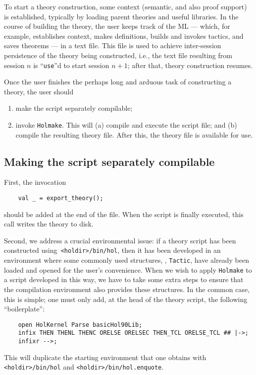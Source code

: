 To start a theory construction, some context (semantic, and also proof
support) is established, typically by loading parent theories and useful
libraries. In the course of building the theory, the user keeps track of
the ML --- which, for example, establishes context, makes definitions,
builds and invokes tactics, and saves theorems --- in a text file. This
file is used to achieve inter-session persistence of the theory being
constructed, i.e., the text file resulting from session $n$ is
``\verb+use+''d to start session $n+1$; after that, theory construction
resumes.

Once the user finishes the perhaps long and arduous task of constructing
a theory, the user should
\begin{enumerate}
\item make the script separately compilable; 
\item invoke {\tt Holmake}. This will (a) compile and execute the script
       file; and (b) compile the resulting theory file. After this, the
       theory file is available for use.
\end{enumerate}

\subsection{Making the script separately compilable}

First, the invocation
\begin{verbatim}
    val _ = export_theory();
\end{verbatim}
should be added at the end of the file. When the script is finally
executed, this call writes the theory to disk.

Second, we address a crucial environmental issue: if a theory script has
been constructed using\verb+ <holdir>/bin/hol+, then it has been developed in
an environment where some commonly used structures, \eg, \verb+Tactic+, have
already been loaded and opened for the user's convenience. When we wish
to apply {\tt Holmake} to a script developed in this way, we have to take some
extra steps to ensure that the compilation environment also provides
these structures.  In the common case, this is simple; one must only
add, at the head of the theory script, the following ``boilerplate'':
\begin{verbatim}
    open HolKernel Parse basicHol90Lib;
    infix THEN THENL THENC ORELSE ORELSEC THEN_TCL ORELSE_TCL ## |->;
    infixr -->;
\end{verbatim}
This will duplicate the starting environment that one obtains with
\verb+<holdir>/bin/hol+ and \verb+<holdir>/bin/hol.enquote+.

